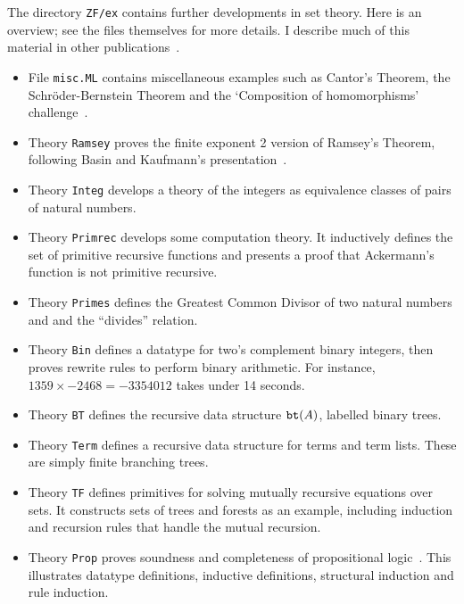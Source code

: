 The directory \texttt{ZF/ex} contains further developments in {\ZF} set
theory.  Here is an overview; see the files themselves for more details.  I
describe much of this material in other
publications~\cite{paulson-set-I,paulson-set-II,paulson-CADE}. 
\begin{itemize}
\item File \texttt{misc.ML} contains miscellaneous examples such as
  Cantor's Theorem, the Schr\"oder-Bernstein Theorem and the `Composition
  of homomorphisms' challenge~\cite{boyer86}.

\item Theory \texttt{Ramsey} proves the finite exponent 2 version of
  Ramsey's Theorem, following Basin and Kaufmann's
  presentation~\cite{basin91}.

\item Theory \texttt{Integ} develops a theory of the integers as
  equivalence classes of pairs of natural numbers.

\item Theory \texttt{Primrec} develops some computation theory.  It
  inductively defines the set of primitive recursive functions and presents a
  proof that Ackermann's function is not primitive recursive.

\item Theory \texttt{Primes} defines the Greatest Common Divisor of two
  natural numbers and and the ``divides'' relation.

\item Theory \texttt{Bin} defines a datatype for two's complement binary
  integers, then proves rewrite rules to perform binary arithmetic.  For
  instance, $1359\times {-}2468 = {-}3354012$ takes under 14 seconds.

\item Theory \texttt{BT} defines the recursive data structure ${\tt
    bt}(A)$, labelled binary trees.

\item Theory \texttt{Term} defines a recursive data structure for terms
  and term lists.  These are simply finite branching trees.

\item Theory \texttt{TF} defines primitives for solving mutually
  recursive equations over sets.  It constructs sets of trees and forests
  as an example, including induction and recursion rules that handle the
  mutual recursion.

\item Theory \texttt{Prop} proves soundness and completeness of
  propositional logic~\cite{paulson-set-II}.  This illustrates datatype
  definitions, inductive definitions, structural induction and rule
  induction.


\end{itemize}
